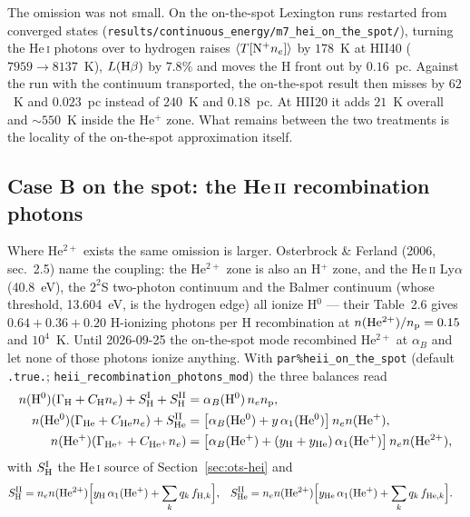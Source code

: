 \documentclass[english,a4paper]{my_memo}
\newcommand{\code}[1]{\texttt{#1}}
\begin{document}
The omission was not small.  On the on-the-spot Lexington runs restarted
from converged states
(\code{results/\allowbreak continuous\_energy/\allowbreak m7\_hei\_on\_the\_spot/}),
turning the He\,\textsc{i} photons over to hydrogen
raises $\langle T[{\rm N^+}n_e]\rangle$ by $178$~K at HII40
($7959\rightarrow8137$~K), $L({\rm H}\beta)$ by $7.8\%$ and moves the
H front out by $0.16$~pc.  Against the run with the continuum transported,
the on-the-spot result then misses by $62$~K and $0.023$~pc instead of
$240$~K and $0.18$~pc.  At HII20 it adds $21$~K overall and ${\sim}550$~K
inside the He$^+$ zone.  What remains between the two treatments is the
locality of the on-the-spot approximation itself.

\subsection{Case B on the spot: the He\,\textsc{ii} recombination photons}
\label{sec:ots-heii}
Where He$^{2+}$ exists the same omission is larger.  Osterbrock \& Ferland
(2006, sec.~2.5) name the coupling: the He$^{2+}$ zone is also an H$^+$
zone, and the He\,\textsc{ii} Ly$\alpha$ (40.8~eV), the $2^2$S two-photon
continuum and the Balmer continuum (whose threshold, 13.604~eV, is the
hydrogen edge) all ionize H$^0$ --- their Table~2.6 gives $0.64+0.36+0.20$
H-ionizing photons per H recombination at $n({\rm He^{2+}})/n_{\rm p}=0.15$
and $10^4$~K.  Until 2026-09-25 the on-the-spot mode recombined He$^{2+}$ at
$\alpha_B$ and let none of those photons ionize anything.  With
\code{par\%heii\_on\_the\_spot} (default \code{.true.};
\code{heii\_recombination\_photons\_mod}) the three balances read
\begin{align}
 n({\rm H^0})(\Gamma_{\rm H}+C_{\rm H}n_e) + S_{\rm H}^{\rm I} + S_{\rm H}^{\rm II}
   &= \alpha_B({\rm H^0})\,n_e n_{\rm p}, \\
 n({\rm He^0})(\Gamma_{\rm He}+C_{\rm He}n_e) + S_{\rm He}^{\rm II}
   &= \bigl[\alpha_B({\rm He^0}) + y\,\alpha_1({\rm He^0})\bigr]\,n_e n({\rm He^+}), \\
 n({\rm He^+})(\Gamma_{\rm He^+}+C_{\rm He^+}n_e)
   &= \bigl[\alpha_B({\rm He^+}) + (y_{\rm H}+y_{\rm He})\,\alpha_1({\rm He^+})\bigr]\,
      n_e n({\rm He^{2+}}),
\end{align}
with $S_{\rm H}^{\rm I}$ the He\,\textsc{i} source of
Section~\ref{sec:ots-hei} and
\begin{align}
 S_{\rm H}^{\rm II}  &= n_e n({\rm He^{2+}})\Bigl[y_{\rm H}\,\alpha_1({\rm He^+})
    + \sum_k q_k\,f_{{\rm H},k}\Bigr], &
 S_{\rm He}^{\rm II} &= n_e n({\rm He^{2+}})\Bigl[y_{\rm He}\,\alpha_1({\rm He^+})
    + \sum_k q_k\,f_{{\rm He},k}\Bigr].
\end{align}
\end{document}
